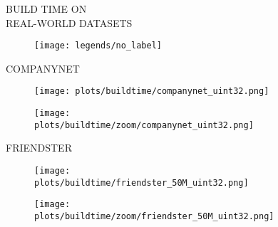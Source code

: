 \documentclass{article}
\begin{document}
\begin{figure}[!htbp]
\fbox
{
\begin{minipage}[t][0.98\textheight][t]{\textwidth}
\centering
\vspace*{-0.40cm}
    \begin{minipage}{0.2\linewidth}
    \footnotesize{BUILD TIME ON \\ REAL-WORLD DATASETS}
    \end{minipage}
   \begin{minipage}{0.75\linewidth}
        \begin{figure}[H]
        \texttt{[image: legends/no\_label]}
        \end{figure}
    \end{minipage}
    \vspace*{-18px}
    
    \begin{minipage}{0.03\linewidth}
    \begin{sideways}\small COMPANYNET\end{sideways}
    \end{minipage}
    \begin{minipage}{0.39\linewidth}
        \begin{figure}[H]
        \texttt{[image: plots/buildtime/companynet\_uint32.png]}
        \end{figure}
    \end{minipage}
    \begin{minipage}{0.39\linewidth}
        \begin{figure}[H]
            \texttt{[image: plots/buildtime/zoom/companynet\_uint32.png]}
        \end{figure}
    \end{minipage}
\vspace*{-0.6cm}

\begin{minipage}{0.03\linewidth}
    \begin{sideways}\small FRIENDSTER\end{sideways}
    \end{minipage}
    \begin{minipage}{0.39\linewidth}
        \begin{figure}[H]
        \texttt{[image: plots/buildtime/friendster\_50M\_uint32.png]}
        \end{figure}
    \end{minipage}
    \begin{minipage}{0.39\linewidth}
        \begin{figure}[H]
            \texttt{[image: plots/buildtime/zoom/friendster\_50M\_uint32.png]}
        \end{figure}
    \end{minipage}
\vspace*{-0.6cm}


\end{minipage}}
\end{figure}
\end{document}
